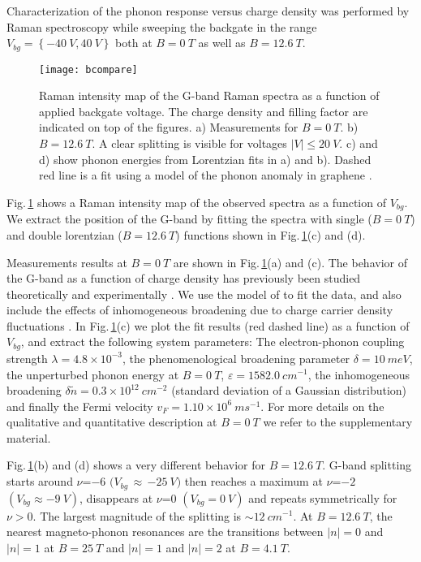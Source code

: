 \documentclass[prl,aps,superscriptaddress,showpacs,reprint]{revtex4-1}
\begin{document}
Characterization of the phonon response versus charge density was performed by Raman spectroscopy while sweeping the backgate in the range $V_{bg}=\left\lbrace -40\: V,40\: V \right\rbrace$ both at $B=0\: T$ as well as $B=12.6\: T$.
\begin{figure}[!hb]
\texttt{[image: bcompare]}
\caption{\label{bcompare}
Raman intensity map of the G-band Raman spectra as a function of applied backgate voltage. The charge density and filling factor are indicated on top of the figures. a) Measurements for $B=0\: T$. b) $B=12.6\: T$. A clear splitting is visible for voltages $\left|V\right|\leq 20\: V$. c) and d)  show phonon energies from Lorentzian fits in a) and b). Dashed red line is a fit using a model of the phonon anomaly in graphene \cite{tsuneya2006anomaly}.}
\end{figure}
Fig.\,\ref{bcompare} shows a Raman intensity map of the observed spectra as a function of $V_{bg}$. We extract the position of the G-band by fitting the spectra with single ($B=0\: T$) and double lorentzian ($B=12.6\: T$) functions shown in Fig.\,\ref{bcompare}(c) and (d).

Measurements results at $B=0\: T$ are shown in Fig.\,\ref{bcompare}(a) and (c).
The behavior of the G-band  as a function of charge density has previously been studied theoretically and experimentally \cite{pisana2007breakdown,yan2007electric,stampfer2007raman,tsuneya2006anomaly}.  We use the model of \cite{tsuneya2006anomaly} to fit the data, and also include the effects of inhomogeneous broadening due to charge carrier density fluctuations \cite{yan2007electric}. In Fig.\,\ref{bcompare}(c) we plot the fit results (red dashed line) as a function of $V_{bg}$, and extract the following system parameters: The electron-phonon coupling strength $\lambda = 4.8\times 10^{-3}$, the phenomenological broadening parameter \cite{tsuneya2006anomaly} $\delta=10\:  meV$, the unperturbed phonon energy at $B=0\: T$, $\varepsilon=1582.0\: cm^{-1}$, the inhomogeneous broadening $\delta \widetilde{n}=0.3\times 10^{12}\: cm^{-2}$ (standard deviation of a Gaussian distribution) and finally the Fermi velocity $v_F=1.10\times 10^6\: ms^{-1}$.  For more details on the qualitative and quantitative description at $B=0\: T$ we refer to the supplementary material.


Fig.\,\ref{bcompare}(b) and (d) shows a very different behavior for $B=12.6\: T$.
G-band splitting starts around $\nu$=$-6$ $(V_{bg}$\,$\approx$\,$-25\: V)$ then reaches a maximum at $\nu$=$-2$ $(V_{bg}\approx-9\: V)$, disappears at $\nu$=$0$ $(V_{bg} = 0\: V)$ and repeats symmetrically for $\nu>0$. The largest magnitude of the splitting is $\sim 12\: cm^{-1}$. At $B=12.6\: T$, the nearest magneto-phonon resonances are the transitions between $\left|n\right|=0$ and $\left|n\right|=1$ at $B=25\: T$ and $\left|n\right|=1$ and $\left|n\right|=2$ at $B=4.1\: T$.
\end{document}
